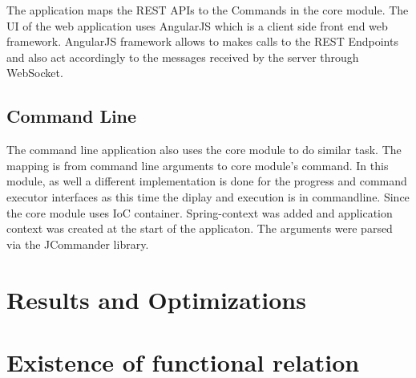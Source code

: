 The application maps the REST APIs to the Commands in the core module. The UI of the web application uses AngularJS which is a client side front end web framework. AngularJS framework allows to makes calls to the REST Endpoints and also act accordingly to the messages received by the server through WebSocket.

\subsection{Command Line}

The command line application also uses the core module to do similar task. The mapping is from command line arguments to core module's command. In this module, as well a different implementation is done for the progress and command executor interfaces as this time the diplay and execution is in commandline. Since the core module uses IoC container. Spring-context was added and application context was created at the start of the applicaton. The arguments were parsed via the JCommander library. 

\section{Results and Optimizations}

\section{Existence of functional relation}

